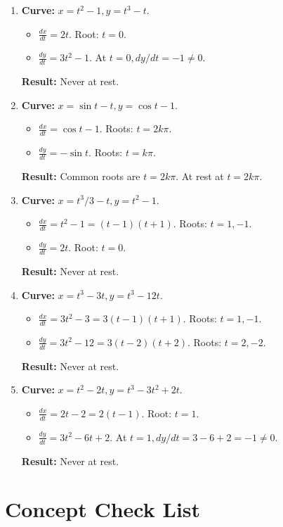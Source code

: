 \documentclass[12pt]{article}
\newcommand{\problemsettitle}[1]{\section*{#1}}
\begin{document}
\begin{enumerate}
    \item \textbf{Curve:} $x=t^2-1, y=t^3-t$.
    \begin{itemize}
        \item $\frac{dx}{dt}=2t$. Root: $t=0$.
        \item $\frac{dy}{dt}=3t^2-1$. At $t=0, dy/dt=-1 \ne 0$.
    \end{itemize}
    \textbf{Result:} Never at rest.

    \item \textbf{Curve:} $x=\sin t - t, y=\cos t-1$.
    \begin{itemize}
        \item $\frac{dx}{dt}=\cos t - 1$. Roots: $t=2k\pi$.
        \item $\frac{dy}{dt}=-\sin t$. Roots: $t=k\pi$.
    \end{itemize}
    \textbf{Result:} Common roots are $t=2k\pi$. At rest at $t=2k\pi$.

    \item \textbf{Curve:} $x=t^3/3-t, y=t^2-1$.
    \begin{itemize}
        \item $\frac{dx}{dt}=t^2-1=(t-1)(t+1)$. Roots: $t=1, -1$.
        \item $\frac{dy}{dt}=2t$. Root: $t=0$.
    \end{itemize}
    \textbf{Result:} Never at rest.

    \item \textbf{Curve:} $x=t^3-3t, y=t^3-12t$.
    \begin{itemize}
        \item $\frac{dx}{dt}=3t^2-3=3(t-1)(t+1)$. Roots: $t=1, -1$.
        \item $\frac{dy}{dt}=3t^2-12=3(t-2)(t+2)$. Roots: $t=2, -2$.
    \end{itemize}
    \textbf{Result:} Never at rest.

    \item \textbf{Curve:} $x=t^2-2t, y=t^3-3t^2+2t$.
    \begin{itemize}
        \item $\frac{dx}{dt}=2t-2=2(t-1)$. Root: $t=1$.
        \item $\frac{dy}{dt}=3t^2-6t+2$. At $t=1, dy/dt = 3-6+2 = -1 \ne 0$.
    \end{itemize}
    \textbf{Result:} Never at rest.
\end{enumerate}

\newpage
\problemsettitle{Concept Check List}
\end{document}

